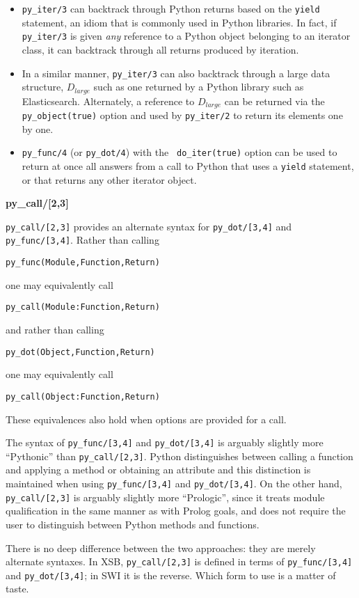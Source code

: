 \begin{itemize}
  \item {\tt py\_iter/3} can backtrack through Python returns based on
    the {\tt yield} statement, an idiom that is commonly used in
    Python libraries.  In fact, if {\tt py\_iter/3} is given {\em any}
    reference to a Python object belonging to an iterator class, it
    can backtrack through all returns produced by iteration.
  \item In a similar manner, {\tt py\_iter/3} can also backtrack
    through a large data structure, $D_{large}$ such as one returned
    by a Python library such as Elasticsearch.  Alternately, a
    reference to $D_{large}$ can be returned via the {\tt
      py\_object(true)} option and used by {\tt py\_iter/2} to return
    its elements one by one.
    \item {\tt py\_func/4} (or {\tt py\_dot/4}) with the {\tt
      do\_iter(true)} option can be used to return at once all answers
      from a call to Python that uses a {\tt yield} statement, or that
      returns any other iterator object.
\end{itemize}

\begin{example} {\bf py\_call/[2,3]} \rm \label{jns-examp:pycall}

\noindent
    {\tt py\_call/[2,3]} provides an alternate syntax for
    {\tt py\_dot/[3,4]} and {\tt py\_func/[3,4]}.  Rather than calling

{\tt py\_func(Module,Function,Return)}

\noindent
one may equivalently call 

{\tt py\_call(Module:Function,Return)}

\noindent
and rather than calling 

{\tt py\_dot(Object,Function,Return)}

\noindent
one may equivalently call 

{\tt py\_call(Object:Function,Return)}

\noindent
These equivalences also hold when options are provided for a call.

The syntax of {\tt py\_func/[3,4]} and {\tt py\_dot/[3,4]} is arguably
slightly more ``Pythonic'' than {\tt py\_call/[2,3]}.  Python
distinguishes between calling a function and applying a method or
obtaining an attribute and this distinction is maintained when using
{\tt py\_func/[3,4]} and {\tt py\_dot/[3,4]}.  On the other hand, {\tt
  py\_call/[2,3]} is arguably slightly more ``Prologic'', since it
treats module qualification in the same manner as with Prolog goals,
and does not require the user to distinguish between Python methods
and functions.

There is no deep difference between the two approaches: they are
merely alternate syntaxes.  In XSB, {\tt py\_call/[2,3]} is defined in
terms of {\tt py\_func/[3,4]} and {\tt py\_dot/[3,4]}; in SWI it is
the reverse.  Which form to use is a matter of taste.
\end{example}

